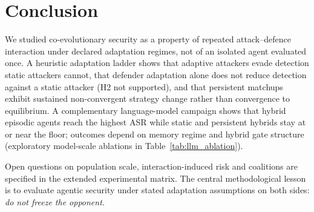 \section{Conclusion}
\label{sec:conclusion}

We studied co-evolutionary security as a property of repeated attack--defence
interaction under declared adaptation regimes, not of an isolated agent
evaluated once. A heuristic adaptation ladder shows that adaptive attackers
evade detection static attackers cannot, that defender adaptation alone does
not reduce detection against a static attacker (H2 not supported), and that
persistent matchups exhibit sustained non-convergent strategy change rather
than convergence to equilibrium. A complementary language-model campaign shows
that hybrid episodic agents reach the highest ASR while static and persistent
hybrids stay at or near the floor; outcomes depend on memory regime and hybrid
gate structure (exploratory model-scale ablations in Table~\ref{tab:llm_ablation}).

Open questions on population scale, interaction-induced risk and coalitions
are specified in the extended experimental matrix. The central methodological
lesson is to evaluate agentic security under stated adaptation assumptions on
both sides: \emph{do not freeze the opponent.}
